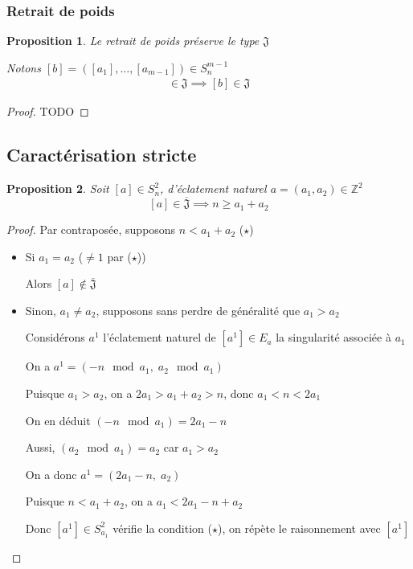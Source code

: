 \documentclass{article}
\newtheorem{proposition}{Proposition}
\begin{document}
\subsubsection{Retrait de poids}

\begin{proposition}
    Le retrait de poids préserve le type $\mathfrak{J}$

    Notons $[b] = ([a_1], \dots, [a_{m-1}]) \in S_n^{m-1}$
    \begin{align*}
        [a] \in \mathfrak{J} \implies [b] \in \mathfrak{J}
    \end{align*}
\end{proposition}

\begin{proof}
    TODO
\end{proof}

\newpage

\subsection{Caractérisation stricte}

\begin{proposition}
    Soit $[a] \in S_n^2$, d'éclatement naturel $a = (a_1, a_2) \in \mathbb{Z}^2$
    \[ [a] \in \overline{\mathfrak{J}} \implies n \geq a_1 + a_2 \]
\end{proposition} 

\begin{proof}
    Par contraposée, supposons $n < a_1 + a_2$ ($\star$)

    \begin{itemize}
        \item Si $a_1 = a_2$ ($\neq 1$ par ($\star$))

            Alors $[a] \not \in \overline{\mathfrak{J}}$
        \item Sinon, $a_1 \neq a_2$, supposons sans perdre de généralité que $a_1 > a_2$

            Considérons $a^1$ l'éclatement naturel de $[a^1] \in E_a$ la singularité associée à $a_1$

            On a $a^1 = (-n \mod a_1,\; a_2 \mod a_1)$

            Puisque $a_1 > a_2$, on a $2a_1 > a_1 + a_2 > n$, donc $a_1 < n < 2a_1$

            On en déduit $(-n \mod a_1) = 2a_1 - n$

            Aussi, $(a_2 \mod a_1) = a_2$ car $a_1 > a_2$

            On a donc $a^1 = (2a_1-n,\; a_2)$

            Puisque $n < a_1 + a_2$, on a $a_1 < 2a_1 - n + a_2$

            Donc $[a^1] \in S_{a_1}^2$ vérifie la condition ($\star$), on répète le raisonnement avec $[a^1]$
    \end{itemize}
\end{proof}
\end{document}
